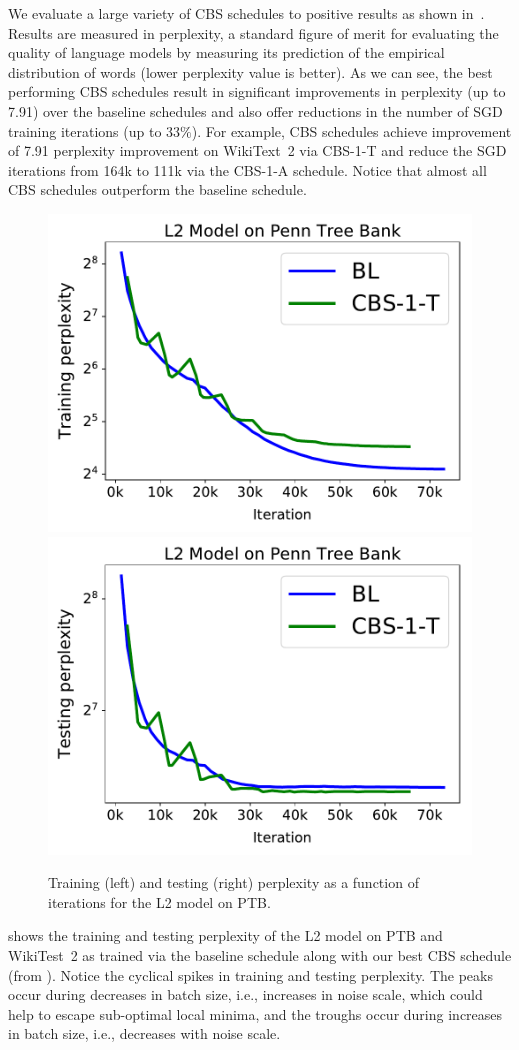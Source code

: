 We evaluate a large variety of CBS schedules to positive results as shown in~. 
Results are measured in perplexity, a standard figure of merit for evaluating the quality of language models by measuring its prediction of the empirical distribution of words (lower perplexity value is better). 
As we can see, the best performing CBS schedules result in significant improvements in
perplexity (up to 7.91) over the baseline schedules and also offer reductions in the number of SGD training iterations (up to $33\%$). For example, CBS schedules achieve improvement of 7.91 perplexity improvement on WikiText~2 via CBS-1-T and reduce the SGD iterations from 164k to 111k via the CBS-1-A schedule.
Notice that almost all CBS schedules outperform the baseline schedule.
\begin{figure}[!htbp]
  \centering
\includegraphics[width=.4\textwidth]{fig/train_l2_ptb.pdf}
\includegraphics[width=.4\textwidth]{fig/test_l2_ptb.pdf}
  \caption{\footnotesize Training (left) and testing (right) perplexity as a function of iterations for the L2 model on PTB.}
  \label{fig:l2_ptb}
\end{figure}

 shows the training and testing perplexity of the L2 model on PTB and WikiTest~2 as trained via the baseline schedule 
along with our best CBS schedule (from ). Notice the cyclical spikes in training and testing perplexity. The peaks occur during  decreases in batch size, i.e., increases in noise scale, which could help to escape sub-optimal local minima, and the troughs occur during increases in batch size, i.e., decreases with noise scale.

